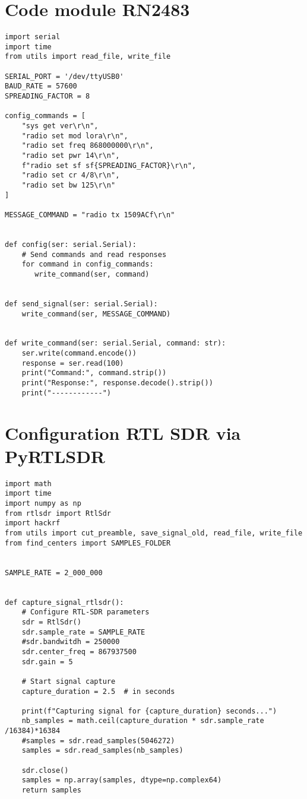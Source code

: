 \newpage

\section{Code module RN2483}\label{codern}

\begin{lstlisting}[style=pythonstyle, caption={Configuration module RN2483}, label={lst:python}]
import serial
import time
from utils import read_file, write_file

SERIAL_PORT = '/dev/ttyUSB0'
BAUD_RATE = 57600
SPREADING_FACTOR = 8

config_commands = [
    "sys get ver\r\n",
    "radio set mod lora\r\n",
    "radio set freq 868000000\r\n",
    "radio set pwr 14\r\n",
    f"radio set sf sf{SPREADING_FACTOR}\r\n",
    "radio set cr 4/8\r\n",
    "radio set bw 125\r\n"
]

MESSAGE_COMMAND = "radio tx 1509ACf\r\n"


def config(ser: serial.Serial):
    # Send commands and read responses
    for command in config_commands:
       write_command(ser, command)


def send_signal(ser: serial.Serial):
    write_command(ser, MESSAGE_COMMAND)


def write_command(ser: serial.Serial, command: str):
    ser.write(command.encode())
    response = ser.read(100)
    print("Command:", command.strip())
    print("Response:", response.decode().strip())
    print("------------")
\end{lstlisting}

\newpage

\section{Configuration RTL SDR via PyRTLSDR}\label{antenne}

\begin{lstlisting}[style=pythonstyle, caption={Configuration RTL SDR}, label={lst:python}]
import math
import time
import numpy as np
from rtlsdr import RtlSdr
import hackrf
from utils import cut_preamble, save_signal_old, read_file, write_file
from find_centers import SAMPLES_FOLDER


SAMPLE_RATE = 2_000_000


def capture_signal_rtlsdr():
    # Configure RTL-SDR parameters
    sdr = RtlSdr()
    sdr.sample_rate = SAMPLE_RATE
    #sdr.bandwitdh = 250000
    sdr.center_freq = 867937500
    sdr.gain = 5

    # Start signal capture
    capture_duration = 2.5  # in seconds

    print(f"Capturing signal for {capture_duration} seconds...")
    nb_samples = math.ceil(capture_duration * sdr.sample_rate /16384)*16384
    #samples = sdr.read_samples(5046272)
    samples = sdr.read_samples(nb_samples)

    sdr.close()
    samples = np.array(samples, dtype=np.complex64)
    return samples
\end{lstlisting}

